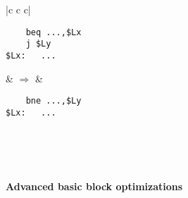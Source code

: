 \documentclass[10pt,a4paper]{article}
\begin{document}
\begin{tabular}{|c c c|}
\hline
\begin{lstlisting}
    beq ...,$Lx
    j $Ly
$Lx:   ...\end{lstlisting} & $\Rightarrow$ & \begin{lstlisting}
    bne ...,$Ly
$Lx:   ...\end{lstlisting}\\
\hline
\end{tabular}\\
\\
\textbf{Advanced basic block optimizations}
\end{document}
